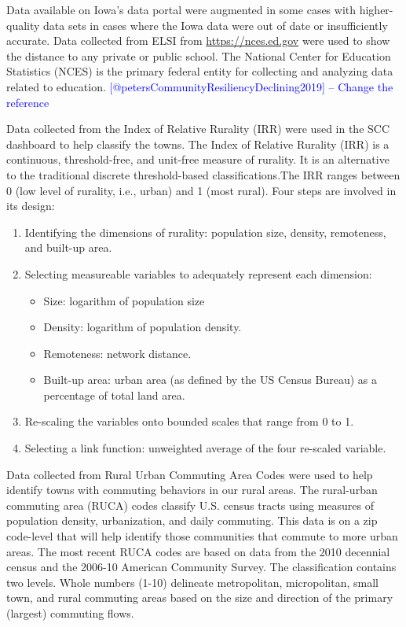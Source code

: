 \documentclass[letterpaper,inpress]{jdsart}
\begin{document}
Data available on Iowa's data portal were augmented in some cases with higher-quality data sets in cases where the Iowa data were out of date or insufficiently accurate.
Data collected from ELSI from \url{https://nces.ed.gov} were used to show the distance to any private or public school. The National Center for Education Statistics (NCES) is the primary federal entity for collecting and analyzing data related to education. {\textcolor{blue}{[@petersCommunityResiliencyDeclining2019] -- Change the reference}}

Data collected from the Index of Relative Rurality (IRR) \citep{Rural_classification} were used in the SCC dashboard to help classify the towns. The Index of Relative Rurality (IRR) is a continuous, threshold-free, and unit-free measure of rurality. It is an alternative to the traditional discrete threshold-based classifications.The IRR ranges between 0 (low level of rurality, i.e., urban) and 1 (most rural). Four steps are involved in its design:

\begin{enumerate}
\item Identifying the dimensions of rurality: population size, density, remoteness, and built-up area.
\item Selecting measureable variables to adequately represent each dimension:
    \begin{itemize}
        \item Size: logarithm of population size
        \item Density: logarithm of population density.
        \item Remoteness: network distance.
        \item Built-up area: urban area (as defined by the US Census Bureau) as a percentage of total land area.
    \end{itemize}
\item Re-scaling the variables onto bounded scales that range from 0 to 1.
\item Selecting a link function: unweighted average of the four re-scaled variable.
\end{enumerate}

Data collected from Rural Urban Commuting Area Codes \citep{usda} were used to help identify towns with commuting behaviors in our rural areas. The rural-urban commuting area (RUCA) codes classify U.S. census tracts using measures of population density, urbanization, and daily commuting. This data is on a zip code-level that will help identify those communities that commute to more urban areas. The most recent RUCA codes are based on data from the 2010 decennial census and the 2006-10 American Community Survey. The classification contains two levels. Whole numbers (1-10) delineate metropolitan, micropolitan, small town, and rural commuting areas based on the size and direction of the primary (largest) commuting flows.
\end{document}
